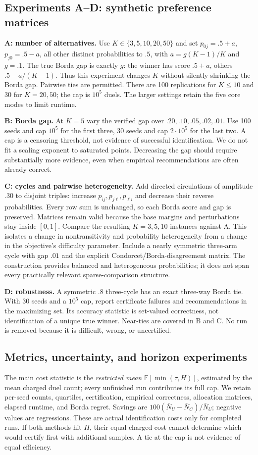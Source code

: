 \documentclass[11pt,a4paper]{article}
\newcommand{\E}{\mathbb E}\newcommand{\Prb}{\mathbb P}
\begin{document}
\subsection{Experiments A--D: synthetic preference matrices}
\textbf{A: number of alternatives.} Use $K\in\{3,5,10,20,50\}$ and set $p_{0j}=.5+a$, $p_{j0}=.5-a$, all other distinct probabilities to $.5$, with $a=g(K-1)/K$ and $g=.1$. The true Borda gap is exactly $g$: the winner has score $.5+a$, others $.5-a/(K-1)$. Thus this experiment changes $K$ without silently shrinking the Borda gap. Pairwise ties are permitted. There are 100 replications for $K\le10$ and 30 for $K=20,50$; the cap is $10^5$ duels. The larger settings retain the five core modes to limit runtime.

\textbf{B: Borda gap.} At $K=5$ vary the verified gap over $.20,.10,.05,.02,.01$. Use 100 seeds and cap $10^5$ for the first three, 30 seeds and cap $2\cdot10^5$ for the last two. A cap is a censoring threshold, not evidence of successful identification. We do not fit a scaling exponent to saturated points. Decreasing the gap should require substantially more evidence, even when empirical recommendations are often already correct.

\textbf{C: cycles and pairwise heterogeneity.} Add directed circulations of amplitude $.30$ to disjoint triples: increase $p_{ij},p_{j\ell},p_{\ell i}$ and decrease their reverse probabilities. Every row sum is unchanged, so each Borda score and gap is preserved. Matrices remain valid because the base margins and perturbations stay inside $[0,1]$. Compare the resulting $K=3,5,10$ instances against A. This isolates a change in nontransitivity and probability heterogeneity from a change in the objective's difficulty parameter. Include a nearly symmetric three-arm cycle with gap $.01$ and the explicit Condorcet/Borda-disagreement matrix. The construction provides balanced and heterogeneous probabilities; it does not span every practically relevant sparse-comparison structure.

\textbf{D: robustness.} A symmetric $.8$ three-cycle has an exact three-way Borda tie. With 30 seeds and a $10^5$ cap, report certificate failures and recommendations in the maximizing set. Its accuracy statistic is set-valued correctness, not identification of a unique true winner. Near-ties are covered in B and C. No run is removed because it is difficult, wrong, or uncertified.

\subsection{Metrics, uncertainty, and horizon experiments}
The main cost statistic is the \emph{restricted mean} $\E[\min(\tau,H)]$, estimated by the mean charged duel count; every unfinished run contributes its full cap. We retain per-seed counts, quartiles, certification, empirical correctness, allocation matrices, elapsed runtime, and Borda regret. Savings are $100(\bar N_U-\bar N_C)/\bar N_U$; negative values are regressions. These are actual identification costs only for completed runs. If both methods hit $H$, their equal charged cost cannot determine which would certify first with additional samples. A tie at the cap is not evidence of equal efficiency.
\end{document}
